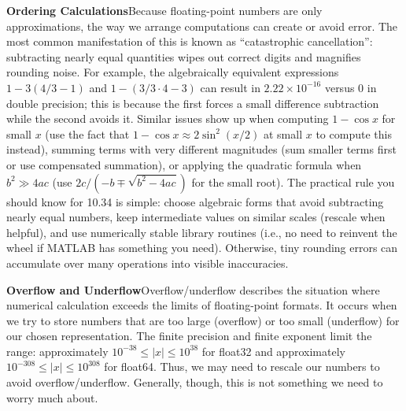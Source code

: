 
\textbf{Ordering Calculations}\quad Because floating-point numbers are only approximations, the way we arrange computations can create or avoid error. The most common manifestation of this is known as ``catastrophic cancellation'': subtracting nearly equal quantities wipes out correct digits and magnifies rounding noise. For example, the algebraically equivalent expressions $1-3(4/3-1)$ and $1-(3/3\cdot 4-3)$ can result in $2.22\times10^{-16}$ versus $0$ in double precision; this is because the first forces a small difference subtraction while the second avoids it. Similar issues show up when computing $1-\cos x$ for small $x$ (use the fact that $1-\cos x \approx 2\sin^2(x/2)$ at small $x$ to compute this instead), summing terms with very different magnitudes (sum smaller terms first or use compensated summation), or applying the quadratic formula when $b^2\gg4ac$ (use $2c/(-b\mp\sqrt{b^2-4ac})$ for the small root). The practical rule you should know for 10.34 is simple: choose algebraic forms that avoid subtracting nearly equal numbers, keep intermediate values on similar scales (rescale when helpful), and use numerically stable library routines (i.e., no need to reinvent the wheel if MATLAB has something you need). Otherwise, tiny rounding errors can accumulate over many operations into visible inaccuracies.

\textbf{Overflow and Underflow}\quad  Overflow/underflow describes the situation where numerical calculation exceeds the limits of floating-point formats. It occurs when we try to store numbers that are too large (overflow) or too small (underflow) for our chosen representation. The finite precision and finite exponent limit the range: approximately $10^{-38} \leq |x| \leq 10^{38}$ for float32 and approximately $10^{-308} \leq |x| \leq 10^{308}$ for float64. Thus, we may need to rescale our numbers to avoid overflow/underflow. Generally, though, this is not something we need to worry much about.

